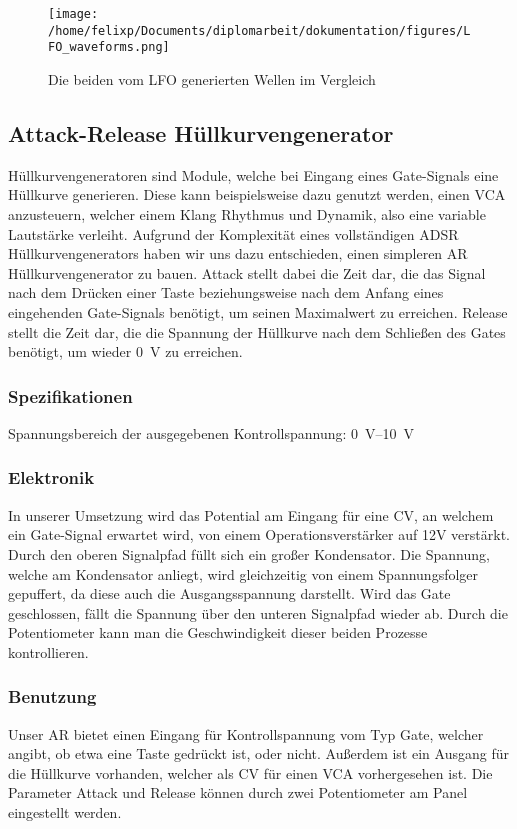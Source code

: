 \begin{figure}[hp]
\centering
\texttt{[image: /home/felixp/Documents/diplomarbeit/dokumentation/figures/LFO\_waveforms.png]}
\caption{\label{fig:orgb0b037e}Die beiden vom LFO generierten Wellen im Vergleich}
\end{figure}
\subsection{Attack-Release Hüllkurvengenerator \label{AR}}
\label{sec:org91fc8b5}
Hüllkurvengeneratoren sind Module, welche bei Eingang eines Gate-Signals eine Hüllkurve generieren. Diese kann beispielsweise dazu genutzt werden, einen \ac{VCA} anzusteuern, welcher einem Klang Rhythmus und Dynamik, also eine variable Lautstärke verleiht. Aufgrund der Komplexität eines vollständigen \ac{ADSR} Hüllkurvengenerators haben wir uns dazu entschieden, einen simpleren \ac{AR} Hüllkurvengenerator zu bauen. Attack stellt dabei die Zeit dar, die das Signal nach dem Drücken einer Taste beziehungsweise nach dem Anfang eines eingehenden Gate-Signals benötigt, um seinen Maximalwert zu erreichen. Release stellt die Zeit dar, die die Spannung der Hüllkurve nach dem Schließen des Gates benötigt, um wieder \SI{0}{\volt} zu erreichen.

\subsubsection{Spezifikationen}
\label{sec:orgaaa285a}
Spannungsbereich der ausgegebenen Kontrollspannung: \SIrange{0}{10}{\volt}

\subsubsection{Elektronik}
\label{sec:org831c069}
In unserer Umsetzung wird das Potential am Eingang für eine \acl{CV}, an welchem ein Gate-Signal erwartet wird, von einem Operationsverstärker auf 12V verstärkt. Durch den oberen Signalpfad füllt sich ein großer Kondensator. Die Spannung, welche am Kondensator anliegt, wird gleichzeitig von einem Spannungsfolger gepuffert, da diese auch die Ausgangsspannung darstellt. Wird das Gate geschlossen, fällt die Spannung über den unteren Signalpfad wieder ab. Durch die Potentiometer kann man die Geschwindigkeit dieser beiden Prozesse kontrollieren.

\subsubsection{Benutzung}
\label{sec:org1cf8904}
Unser AR bietet einen Eingang für Kontrollspannung vom Typ Gate, welcher angibt, ob etwa eine Taste gedrückt ist, oder nicht. Außerdem ist ein Ausgang für die Hüllkurve vorhanden, welcher als \acl{CV} für einen \ac{VCA} vorhergesehen ist. Die Parameter Attack und Release können durch zwei Potentiometer am Panel eingestellt werden.


